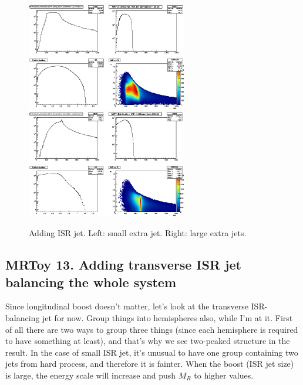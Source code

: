 \documentclass{fheadnote}
\begin{document}
\begin{figure}[htbp]
   \centering
   \includegraphics[width=7cm]{Figures/MRToy10_SmallISRJet}
   \includegraphics[width=7cm]{Figures/MRToy10_LargeISRJet}
   \caption{Adding ISR jet.  Left: small extra jet.  Right: large extra jets.}
   \label{Figure_MRToy10}
\end{figure}


\subsection{MRToy 13.  Adding transverse ISR jet balancing the whole system}

Since longitudinal boost doesn't matter, let's look at the transverse ISR-balancing jet for now.  Group things into hemispheres also, while I'm at it.
First of all there are two ways to group three things (since each hemisphere is required to have something at least), and that's why we see two-peaked structure in the result.
In the case of small ISR jet, it's unusual to have one group containing two jets from hard process, and therefore it is fainter.
When the boost (ISR jet size) is large, the energy scale will increase and push $M_R$ to higher values.
\end{document}
